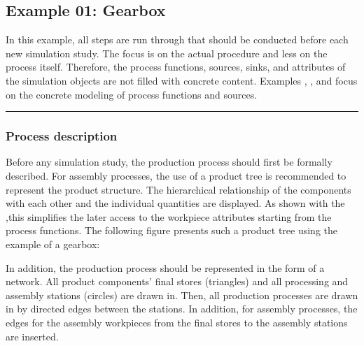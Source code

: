 \documentclass[letterpaper,10pt,english]{sphinxmanual}
\begin{document}
\subsection{Example 01: Gearbox}
\label{\detokenize{source/Examples/example01:example-01-gearbox}}\label{\detokenize{source/Examples/example01:id1}}\label{\detokenize{source/Examples/example01::doc}}
\sphinxAtStartPar
In this example, all steps are run through that should be conducted before each new simulation study. The focus is on
the actual procedure and less on the process itself. Therefore, the process functions, sources, sinks, and attributes of
the simulation objects are not filled with concrete content. Examples  {\hyperref[\detokenize{source/Examples/example02:id1}]{}}, {\hyperref[\detokenize{source/Examples/example03:id1}]{}}, and
{\hyperref[\detokenize{source/Examples/example04:id1}]{}} focus on the concrete modeling of process functions and sources.


\bigskip\hrule\bigskip



\subsubsection{Process description}
\label{\detokenize{source/Examples/example01:process-description}}
\sphinxAtStartPar
Before any simulation study, the production process should first be formally described. For assembly processes, the use
of a product tree is recommended to represent the product structure. The hierarchical relationship of the components
with each other and the individual quantities are displayed. As shown with the
{\hyperref[\detokenize{source/Interface_files/function_file:process-function}]{}},this simplifies the later access to the workpiece attributes starting from
the process functions. The following figure presents such a product tree using the example of a gearbox:


\sphinxAtStartPar
In addition, the production process should be represented in the form of a network. All product components’ final stores
(triangles) and all processing and assembly stations (circles) are drawn in. Then, all production processes are drawn in
by directed edges between the stations. In addition, for assembly processes, the edges for the assembly workpieces from
the final stores to the assembly stations are inserted.
\end{document}
